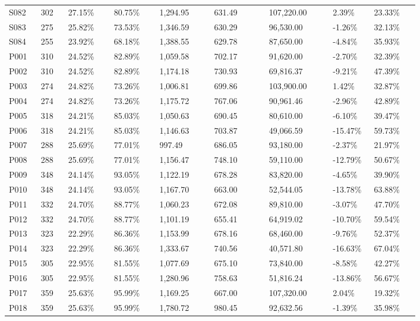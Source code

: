\begin{longtable}{@{}p{0.07\linewidth}p{0.06\linewidth}p{0.1\linewidth}p{0.1\linewidth}p{0.12\linewidth}p{0.12\linewidth}p{0.14\linewidth}p{0.09\linewidth}p{0.1\linewidth}@{}}
S082 & 302 & 27.15\% & 80.75\% & 1,294.95 & 631.49 & 107,220.00 & 2.39\% & 23.33\% \\
S083 & 275 & 25.82\% & 73.53\% & 1,346.59 & 630.29 & 96,530.00 & -1.26\% & 32.13\% \\
S084 & 255 & 23.92\% & 68.18\% & 1,388.55 & 629.78 & 87,650.00 & -4.84\% & 35.93\% \\
P001 & 310 & 24.52\% & 82.89\% & 1,059.58 & 702.17 & 91,620.00 & -2.70\% & 32.39\% \\
P002 & 310 & 24.52\% & 82.89\% & 1,174.18 & 730.93 & 69,816.37 & -9.21\% & 47.39\% \\
P003 & 274 & 24.82\% & 73.26\% & 1,006.81 & 699.86 & 103,900.00 & 1.42\% & 32.87\% \\
P004 & 274 & 24.82\% & 73.26\% & 1,175.72 & 767.06 & 90,961.46 & -2.96\% & 42.89\% \\
P005 & 318 & 24.21\% & 85.03\% & 1,050.63 & 690.45 & 80,610.00 & -6.10\% & 39.47\% \\
P006 & 318 & 24.21\% & 85.03\% & 1,146.63 & 703.87 & 49,066.59 & -15.47\% & 59.73\% \\
P007 & 288 & 25.69\% & 77.01\% & 997.49 & 686.05 & 93,180.00 & -2.37\% & 21.97\% \\
P008 & 288 & 25.69\% & 77.01\% & 1,156.47 & 748.10 & 59,110.00 & -12.79\% & 50.67\% \\
P009 & 348 & 24.14\% & 93.05\% & 1,122.19 & 678.28 & 83,820.00 & -4.65\% & 39.90\% \\
P010 & 348 & 24.14\% & 93.05\% & 1,167.70 & 663.00 & 52,544.05 & -13.78\% & 63.88\% \\
P011 & 332 & 24.70\% & 88.77\% & 1,060.23 & 672.08 & 89,810.00 & -3.07\% & 47.70\% \\
P012 & 332 & 24.70\% & 88.77\% & 1,101.19 & 655.41 & 64,919.02 & -10.70\% & 59.54\% \\
P013 & 323 & 22.29\% & 86.36\% & 1,153.99 & 678.16 & 68,460.00 & -9.76\% & 52.37\% \\
P014 & 323 & 22.29\% & 86.36\% & 1,333.67 & 740.56 & 40,571.80 & -16.63\% & 67.04\% \\
P015 & 305 & 22.95\% & 81.55\% & 1,077.69 & 675.10 & 73,840.00 & -8.58\% & 42.27\% \\
P016 & 305 & 22.95\% & 81.55\% & 1,280.96 & 758.63 & 51,816.24 & -13.86\% & 56.67\% \\
P017 & 359 & 25.63\% & 95.99\% & 1,169.25 & 667.00 & 107,320.00 & 2.04\% & 19.32\% \\
P018 & 359 & 25.63\% & 95.99\% & 1,780.72 & 980.45 & 92,632.56 & -1.39\% & 35.98\% \\

\end{longtable}
